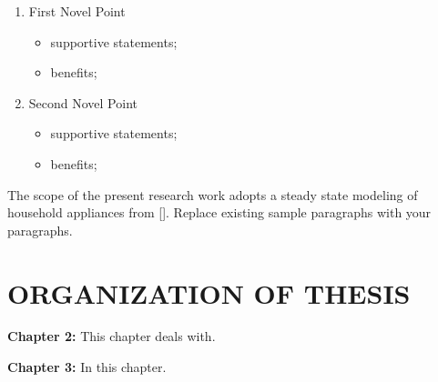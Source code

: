\begin{enumerate}[itemsep=0.2cm,topsep=1pt,parsep=0pt,partopsep=0pt]
\item First Novel Point
\begin{itemize}[itemsep=0cm,topsep=2pt]
\item supportive statements;
\item benefits;
\end{itemize}
\item Second Novel Point
\begin{itemize}[itemsep=0cm,topsep=2pt]
\item supportive statements;
\item benefits;
\end{itemize}

\end{enumerate}

The scope of the present research work adopts a steady state modeling of household appliances from [\cite{arun2017}]. Replace existing sample paragraphs with your paragraphs.

\section{ORGANIZATION OF THESIS}
\noindent \textbf{Chapter 2:} This chapter deals with.

\noindent \textbf{Chapter 3:} In this chapter.